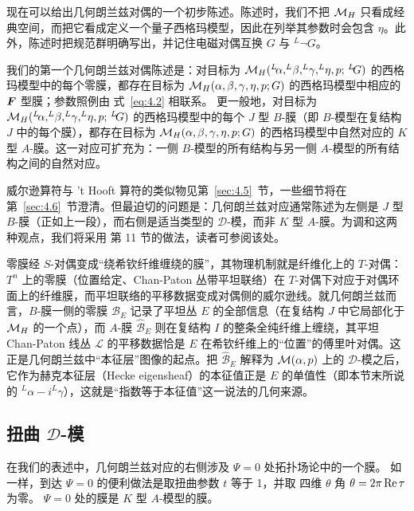 现在可以给出几何朗兰兹对偶的一个初步陈述。陈述时，我们不把 ${{\mathcal{M}}_H}$ 只看成经典空间，而把它看成定义一个量子西格玛模型，因此在列举其参数时会包含 $\eta$。此外，陈述时把规范群明确写出，并记住电磁对偶互换 $G$ 与
$^L\neg G$。

我们的第一个几何朗兰兹对偶陈述是：对目标为
${{\mathcal{M}}_H}(^L\negthinspace\alpha,^L\negthinspace\beta,^L\negthinspace\gamma,^L\negthinspace\eta,p;\,^L\negthinspace
G)$ 的西格玛模型中的每个零膜，都存在目标为
${{\mathcal{M}}_H}(\alpha,\beta,\gamma,\eta,p;G)$ 的西格玛模型中相应的 ${\bm{F}}$ 型膜；参数照例由
式~\eqref{eq:4.2} 相联系。
更一般地，对目标为
${{\mathcal{M}}_H}(^L\negthinspace\alpha,^L\negthinspace\beta,^L\negthinspace\gamma,^L\negthinspace\eta,p;\,^L\negthinspace
G)$ 的西格玛模型中的每个 $J$ 型 $B$-膜（即 $B$-模型在复结构 $J$ 中的每个膜），都存在目标为
${{\mathcal{M}}_H}(\alpha,\beta,\gamma,\eta,p; G)$ 的西格玛模型中自然对应的 $K$ 型 $A$-膜。这一对应可扩充为：一侧 $B$-模型的所有结构与另一侧 $A$-模型的所有结构之间的自然对应。

威尔逊算符与 't Hooft 算符的类似物见第~\ref{sec:4.5}~节，一些细节将在第~\ref{sec:4.6}~节澄清。但最迫切的问题是：几何朗兰兹对应通常陈述为左侧是 $J$ 型 $B$-膜（正如上一段），而右侧是适当类型的 ${\mathcal D}$-模，而非 $K$ 型 $A$-膜。为调和这两种观点，我们将采用 \cite{ref8} 第 11 节的做法，读者可参阅该处。

\begin{yizhu}[物理图像补充]
零膜经 $S$-对偶变成“绕希钦纤维缠绕的膜”，其物理机制就是纤维化上的 $T$-对偶：$T^n$ 上的零膜（位置给定、Chan-Paton 丛带平坦联络）在 $T$-对偶下对应于对偶环面上的纤维膜，而平坦联络的平移数据变成对偶侧的威尔逊线。就几何朗兰兹而言，$B$-膜一侧的零膜 ${\mathcal B}_E$ 记录了平坦丛 $E$ 的全部信息（在复结构 $J$ 中它局部化于 ${{\mathcal{M}}_H}$ 的一个点），而 $A$-膜 $\hat{\mathcal B}_E$ 则在复结构 $I$ 的整条全纯纤维上缠绕，其平坦 Chan-Paton 线丛 ${\mathcal L}$ 的平移数据恰是 $E$ 在希钦纤维上的“位置”的傅里叶对偶。这正是几何朗兰兹中“本征层”图像的起点。把 $\hat{\mathcal B}_E$ 解释为 ${\mathcal{M}}(\alpha,p)$ 上的 ${\mathcal D}$-模之后，它作为赫克本征层（Hecke eigensheaf）的本征值正是 $E$ 的单值性（即本节末所说的 ${}^L\alpha-i{}^L\gamma$），这就是“指数等于本征值”这一说法的几何来源。
\end{yizhu}


\subsection{\texorpdfstring{扭曲 ${\mathcal D}$-模}{扭曲 D-模}}
\label{sec:4.4}


在我们的表述中，几何朗兰兹对应的右侧涉及 $\Psi=0$ 处拓扑场论中的一个膜。
如 \cite{ref8} 一样，到达 $\Psi=0$ 的便利做法是取扭曲参数 $t$ 等于 1，并取
四维 $\theta$ 角 $\theta=2\pi\,{\rm Re}\,\tau$ 为零。
$\Psi=0$ 处的膜是 $K$ 型 $A$-模型的膜。

